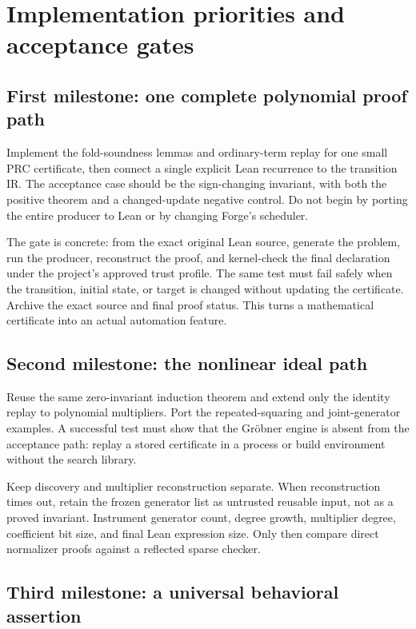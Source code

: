 \section{Implementation priorities and acceptance gates}
\label{sec:roadmap}

\subsection{First milestone: one complete polynomial proof path}

Implement the fold-soundness lemmas and ordinary-term replay for one small PRC certificate, then connect a single explicit Lean recurrence to the transition IR. The acceptance case should be the sign-changing invariant, with both the positive theorem and a changed-update negative control. Do not begin by porting the entire producer to Lean or by changing Forge's scheduler.

The gate is concrete: from the exact original Lean source, generate the problem, run the producer, reconstruct the proof, and kernel-check the final declaration under the project's approved trust profile. The same test must fail safely when the transition, initial state, or target is changed without updating the certificate. Archive the exact source and final proof status. This turns a mathematical certificate into an actual automation feature.

\subsection{Second milestone: the nonlinear ideal path}

Reuse the same zero-invariant induction theorem and extend only the identity replay to polynomial multipliers. Port the repeated-squaring and joint-generator examples. A successful test must show that the Gr\"obner engine is absent from the acceptance path: replay a stored certificate in a process or build environment without the search library.

Keep discovery and multiplier reconstruction separate. When reconstruction times out, retain the frozen generator list as untrusted reusable input, not as a proved invariant. Instrument generator count, degree growth, multiplier degree, coefficient bit size, and final Lean expression size. Only then compare direct normalizer proofs against a reflected sparse checker.

\subsection{Third milestone: a universal behavioral assertion}


